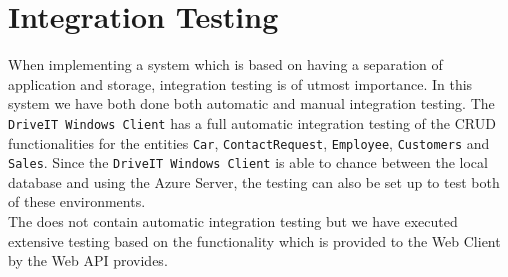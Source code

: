\section{Integration Testing}
When implementing a system which is based on having a separation of application and storage, integration testing is of utmost importance. In this system we have both done both automatic and manual integration testing. The \texttt{DriveIT Windows Client} has a full automatic integration testing of the CRUD functionalities for the entities \texttt{Car}, \texttt{ContactRequest}, \texttt{Employee}, \texttt{Customers} and \texttt{Sales}. Since the \texttt{DriveIT Windows Client} is able to chance between the local database and using the Azure Server, the testing can also be set up to test both of these environments. \\
The  does not contain automatic integration testing but we have executed extensive testing based on the functionality which is provided to the Web Client by the Web API provides.